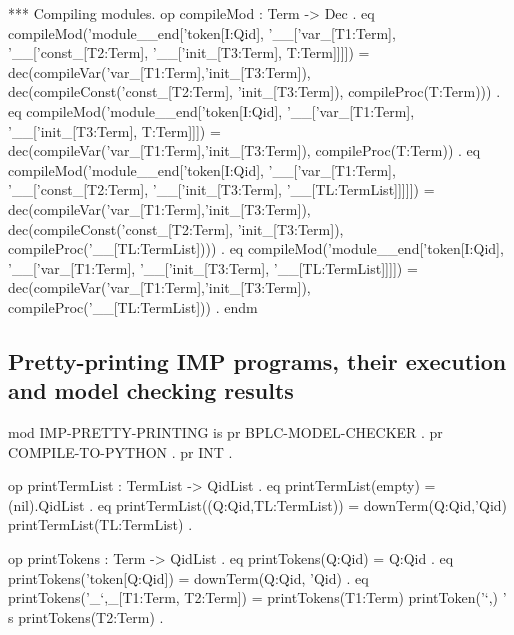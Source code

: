 \documentclass[a4paper,openany]{book}
\begin{document}
 *** Compiling modules.
 op compileMod : Term -> Dec .
 eq compileMod('module__end['token[I:Qid],
               '__['var_[T1:Term],
               '__['const_[T2:Term],
               '__['init_[T3:Term],
                                T:Term]]]]) =
    dec(compileVar('var_[T1:Term],'init_[T3:Term]),
     dec(compileConst('const_[T2:Term], 'init_[T3:Term]),
      compileProc(T:Term))) .
 eq compileMod('module__end['token[I:Qid],
               '__['var_[T1:Term],
               '__['init_[T3:Term],
               T:Term]]]) =
    dec(compileVar('var_[T1:Term],'init_[T3:Term]),
         compileProc(T:Term)) .
 eq compileMod('module__end['token[I:Qid],
               '__['var_[T1:Term],
               '__['const_[T2:Term],
               '__['init_[T3:Term],
               '__[TL:TermList]]]]]) =
    dec(compileVar('var_[T1:Term],'init_[T3:Term]),
     dec(compileConst('const_[T2:Term], 'init_[T3:Term]),
          compileProc('__[TL:TermList]))) .
 eq compileMod('module__end['token[I:Qid],
               '__['var_[T1:Term],
               '__['init_[T3:Term],
               '__[TL:TermList]]]]) =
    dec(compileVar('var_[T1:Term],'init_[T3:Term]),
         compileProc('__[TL:TermList])) .
endm
\nwendcode{}\nwdocspar

\subsection{Pretty-printing IMP programs, their execution and model checking results}

\nwenddocs{}\endmoddef\nwstartdeflinemarkup\nwenddeflinemarkup
mod IMP-PRETTY-PRINTING is
 pr BPLC-MODEL-CHECKER .
 pr COMPILE-TO-PYTHON . 
 pr INT .

 op printTermList : TermList -> QidList .
 eq printTermList(empty) = (nil).QidList .
 eq printTermList((Q:Qid,TL:TermList)) =
    downTerm(Q:Qid,'Qid) printTermList(TL:TermList) .

 op printTokens : Term -> QidList .
 eq printTokens(Q:Qid) = Q:Qid .
 eq printTokens('token[Q:Qid]) = downTerm(Q:Qid, 'Qid) .
 eq printTokens('_`,_[T1:Term, T2:Term]) =
    printTokens(T1:Term) printToken('`,) '\\s printTokens(T2:Term) .
\end{document}
